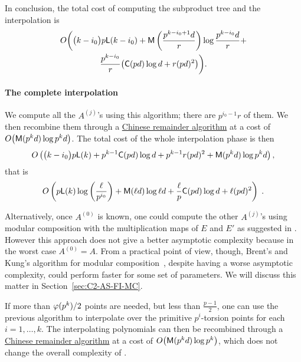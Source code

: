 In conclusion, the total cost of computing the subproduct tree and the
interpolation is
\begin{multline*}
  O\biggl(\bigl(k-i_0\bigr)p\mathsf{L}(k-i_0) + \mathsf{M}\left(\frac{p^{k-i_0+1}d}{r}\right)\log \frac{p^{k-i_0}d}{r} +\\
    \frac{p^{k-i_0}}{r}\bigl(\mathsf{C}(pd)\log d + r(pd)^2\bigr)\biggr)
  \text{.}
\end{multline*}


\paragraph{The complete interpolation}
We compute all the $A^{(j)}$'s using this algorithm; there are
$p^{i_0-1}r$ of them. We then recombine them through a
\hyperref[sec:chin-rema-algor]{Chinese remainder algorithm} at a cost
of $O\bigl(\mathsf{M}(p^kd)\log p^kd\bigr)$. The total cost of the whole
interpolation phase is then
\begin{multline*}
  O\left(\bigl(k-i_0\bigr) p\mathsf{L}(k) + p^{k-1}\mathsf{C}(pd)\log d +
    p^{k-1}r(pd)^2 + \mathsf{M}(p^kd)\log p^kd \right)\text{,}
\end{multline*}
that is
\begin{equation}
  \label{eq:interp}
  O\left(p\mathsf{L}(k)\log\left(\frac{\ell}{p^{i_0}}\right) + 
    \mathsf{M}(\ell d)\log\ell d +
    \frac{\ell}{p}\mathsf{C}(pd)\log d +
    \ell (pd)^2
  \right)
  \;\text{.}
\end{equation}

Alternatively, once $A^{(0)}$ is known, one could compute the other
$A^{(j)}$'s using modular composition with the multiplication maps of
$E$ and $E'$ as suggested in \cite{couveignes96}. However this
approach does not give a better asymptotic complexity because in the
worst case $A^{(0)}=A$. From a practical point of view, though,
Brent's and Kung's algorithm for modular
composition~\cite{brent+kung}, despite having a worse asymptotic
complexity, could perform faster for some set of parameters. We will
discuss this matter in Section~\ref{sec:C2-AS-FI-MC}.

If more than $\varphi(p^k)/2$ points are needed, but less than
$\frac{p-1}{2}$, one can use the previous algorithm to interpolate
over the primitive $p^i$-torsion points for each $i=1,\ldots,k$. The
interpolating polynomials can then be recombined through a
\hyperref[sec:chin-rema-algor]{Chinese remainder algorithm} at a cost
of $O\bigl(\mathsf{M}(p^kd)\log p^k\bigr)$, which does not change the
overall complexity of \ctwoasfi{}.


